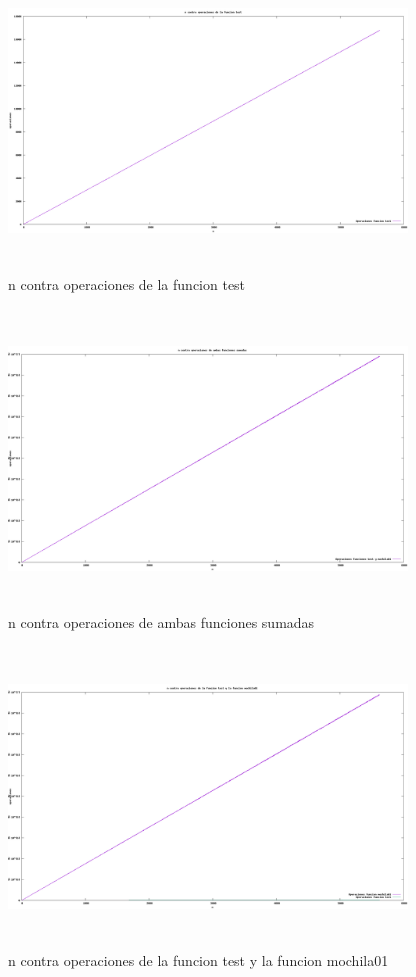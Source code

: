 \documentclass[spanish]{article}
\begin{document}
	\begin{figure}[H]
		\centering
		\includegraphics[width=400px,height=300px]{grafica5}
		\caption{n contra operaciones de la funcion test}
	\end{figure}
	\begin{figure}[H]
		\centering
		\includegraphics[width=400px,height=300px]{grafica6}
		\caption{n contra operaciones de ambas funciones sumadas}
	\end{figure}
	\begin{figure}[H]
		\centering
		\includegraphics[width=400px,height=300px]{grafica7}
		\caption{n contra operaciones de la funcion test y la funcion mochila01}
	\end{figure}
\end{document}
